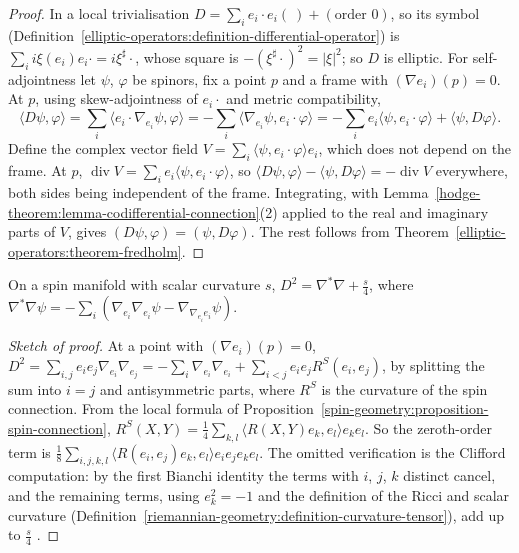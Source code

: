\begin{proof}
In a local trivialisation $D = \sum_ie_i \cdot e_i(\ ) + (\text{order } 0)$, so its symbol (Definition~\ref{elliptic-operators:definition-differential-operator}) is $\sum_ii\xi(e_i)e_i \cdot = i\xi^\sharp \cdot$, whose square is
$-(\xi^\sharp \cdot)^2 = |\xi|^2$; so $D$ is elliptic. For self-adjointness let $\psi$, $\varphi$ be spinors, fix a point $p$ and a frame with $(\nabla e_i)(p) = 0$. At $p$, using skew-adjointness of $e_i \cdot$ and metric
compatibility,
\[
\langle D\psi, \varphi\rangle = \sum_i\langle e_i \cdot \nabla_{e_i}\psi, \varphi\rangle = -\sum_i\langle\nabla_{e_i}\psi, e_i \cdot \varphi\rangle = -\sum_ie_i\langle\psi, e_i \cdot \varphi\rangle + \langle\psi, D\varphi\rangle.
\]
Define the complex vector field $V = \sum_i\langle\psi, e_i \cdot \varphi\rangle e_i$, which does not depend on the frame. At $p$, $\operatorname{div}V = \sum_ie_i\langle\psi, e_i \cdot \varphi\rangle$, so
$\langle D\psi, \varphi\rangle - \langle\psi, D\varphi\rangle = -\operatorname{div}V$ everywhere, both sides being independent of the frame. Integrating, with
Lemma~\ref{hodge-theorem:lemma-codifferential-connection}(2) applied to the real and imaginary parts of $V$, gives $(D\psi, \varphi) = (\psi, D\varphi)$. The rest follows from
Theorem~\ref{elliptic-operators:theorem-fredholm}.
\end{proof}

\begin{theorem}\label{spin-geometry:theorem-lichnerowicz-formula}
On a spin manifold with scalar curvature $s$, $D^2 = \nabla^*\nabla + \frac{s}{4}$, where $\nabla^*\nabla\psi = -\sum_i(\nabla_{e_i}\nabla_{e_i}\psi - \nabla_{\nabla_{e_i}e_i}\psi)$.
\end{theorem}

\begin{proof}[Sketch of proof]
At a point with $(\nabla e_i)(p) = 0$, $D^2 = \sum_{i,j}e_ie_j\nabla_{e_i}\nabla_{e_j} = -\sum_i\nabla_{e_i}\nabla_{e_i} + \sum_{i<j}e_ie_jR^S(e_i, e_j)$, by splitting the sum into $i = j$ and antisymmetric parts, where $R^S$ is the curvature
of the spin connection. From the local formula of Proposition~\ref{spin-geometry:proposition-spin-connection}, $R^S(X, Y) = \frac14\sum_{k,l}\langle R(X, Y)e_k, e_l\rangle e_ke_l$. So the zeroth-order term is
$\frac18\sum_{i,j,k,l}\langle R(e_i, e_j)e_k, e_l\rangle e_ie_je_ke_l$. The omitted verification is the Clifford computation: by the first Bianchi identity the terms with $i$, $j$, $k$ distinct cancel, and the remaining terms, using
$e_k^2 = -1$ and the definition of the Ricci and scalar curvature (Definition~\ref{riemannian-geometry:definition-curvature-tensor}), add up to $\frac{s}{4}$ \cite[Chapter II]{lawson-michelsohn}.
\end{proof}

